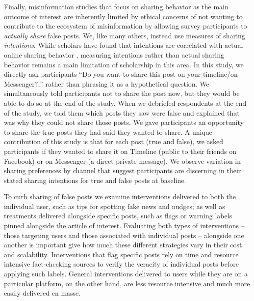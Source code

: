 \documentclass[letterpaper, 12pt, parskip=full,DIV=10]{scrartcl}
\begin{document}
Finally, misinformation studies that focus on sharing behavior as the main outcome of interest are inherently limited by ethical concerns of not wanting to contribute to the ecosystem of misinformation by allowing survey participants to \textit{actually share} false posts. We,  like many others, instead use measures of sharing \textit{intentions}.  While scholars have found that intentions are correlated with actual online sharing behavior \citep{mosleh2020self}, measuring intentions rather than actual sharing behavior remains a main limitation of scholarship in this area.  In this study, we directly ask participants ``Do you want to share this post on your timeline/on Messenger?,'' rather than phrasing it as a hypothetical question. We simultaneously told participants not to share the post now, but they would be able to do so at the end of the study. When we debriefed respondents at the end of the study, we told them which posts they saw were false and explained that was why they could not share those posts. We gave participants an opportunity to share the true posts they had said they wanted to share.  A unique contribution of this study is that for each post (true and false), we asked participants if they wanted to share it on Timeline (public to their friends on Facebook) or on Messenger (a direct private message). We observe variation in sharing preferences by channel that suggest participants are discerning in their stated sharing intentions for true and false posts at baseline. 




To curb sharing of false posts we examine interventions delivered to both the individual user, such as tips for spotting fake news and nudges; as well as treatments delivered alongside specific posts, such as flags or warning labels pinned alongside the article of interest. Evaluating both types of interventions -- those targeting users and those associated with individual posts -- alongside one another is important give how much these different strategies vary in their cost and scalability. Interventions that flag specific posts rely on time and resource intensive fact-checking sources to verify the veracity of individual posts before applying such labels.  General interventions delivered to users while they are on a particular platform, on the other hand, are less resource intensive and much more easily delivered en masse. 
\end{document}
